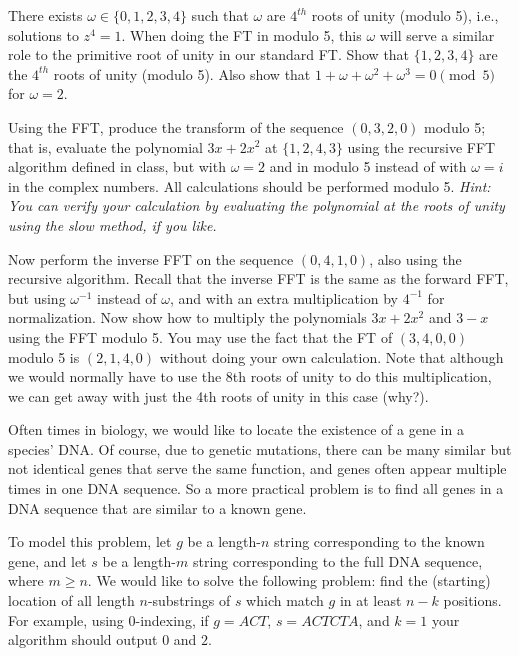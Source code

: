 \documentclass{article}
\begin{document}
\begin{subparts}
\subpart There exists $\omega \in \{0, 1, 2, 3, 4\}$ such that $\omega$ are $4^{th}$ roots of unity (modulo 5), i.e., solutions to $z^4 = 1$. When doing the FT in modulo 5, this $\omega$ will serve a similar role to the primitive root of unity in our standard FT. Show that $\{1,2,3,4\}$ are the $4^{th}$ roots of unity (modulo 5). Also show that $1+\omega + \omega^2 + \omega^3 = 0 \pmod 5$ for $\omega=2$.

\subpart Using the FFT, produce the transform of the sequence $(0, 3, 2, 0)$ modulo 5; that is, evaluate the polynomial $3x+2x^2$ at $\{1, 2, 4, 3\}$ using the recursive FFT algorithm defined in class, but with $\omega=2$ and in modulo 5 instead of with $\omega=i$ in the complex numbers. All calculations should be performed modulo 5. \textit{Hint: You can verify your calculation by evaluating the polynomial at the roots of unity using the slow method, if you like.}

\subpart Now perform the inverse FFT on the sequence $(0, 4, 1, 0)$, also using the recursive algorithm. Recall that the inverse FFT is the same as the forward FFT, but using $\omega^{-1}$ instead of $\omega$, and with an extra multiplication by $4^{-1}$ for normalization.
\subpart Now show how to multiply the polynomials $3x + 2x^2$ and $3 - x$ using the FFT modulo 5. You may use the fact that the FT of $(3, 4, 0, 0)$ modulo 5 is $(2, 1, 4, 0)$ without doing your own calculation. Note that although we would normally have to use the 8th roots of unity to do this multiplication, we can get away with just the 4th roots of unity in this case (why?).
\end{subparts}


Often times in biology, we would like to locate the existence of a gene in a species' DNA. Of course, due to genetic mutations, 
there can be many similar but not identical genes that serve the same function, and genes often appear multiple times in one DNA sequence. 
So a more practical problem is to find all genes in a DNA sequence that are similar to a known gene.

To model this problem, let $g$ be a length-$n$ string corresponding to the known gene, and let $s$ be 
a length-$m$ string corresponding to the full DNA sequence, where $m \geq n$. We would like to solve the following problem:
find the (starting) location of all length $n$-substrings of $s$ which match $g$ in at least $n-k$ positions. 
For example, using $0$-indexing, if $g = ACT$, $s = ACTCTA$, and $k = 1$ your algorithm should output $0$ and $2$.
\end{document}
